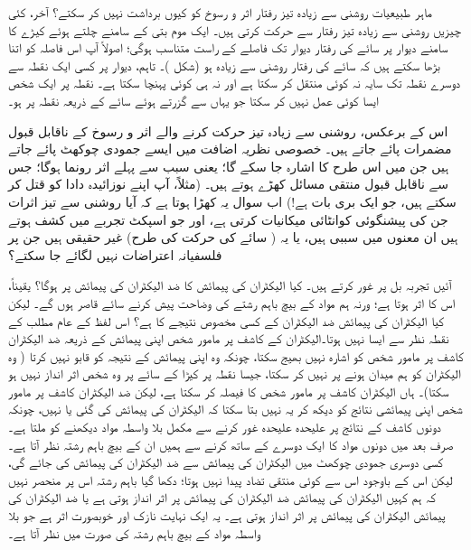 ماہر طبیعیات روشنی سے زیادہ تیز رفتار اثر و رسوخ کو کیوں برداشت نہیں کر سکتے؟ آخر،  کئی چیزیں روشنی سے زیادہ تیز رفتار سے حرکت کرتی ہیں۔ ایک موم بتی کے سامنے چلتے ہوئے کیڑے کا سامنے دیوار پر سائے  کی رفتار دیوار تک فاصلے کے راست متناسب ہوگی؛   اصولاً آپ اس فاصلہ کو اتنا بڑھا سکتے ہیں کہ سائے  کی رفتار روشنی سے زیادہ ہو (شکل )۔ تاہم،  دیوار پر کسی ایک نقطہ سے دوسرے نقطہ تک سایہ نہ کوئی   منتقل کر سکتا ہے اور نہ ہی کوئی   پہنچا سکتا ہے۔ نقطہ  پر ایک شخص ایسا کوئی عمل نہیں کر سکتا جو یہاں سے گزرتے ہوئے سائے کے ذریعہ نقطہ  پر    ہو۔


اس کے برعکس،  روشنی سے زیادہ تیز حرکت کرنے والے   اثر و رسوخ کے ناقابل قبول مضمرات  پائے جاتے ہیں۔ خصوصی نظریہ اضافت میں ایسے جمودی چوکھٹ پائے جاتے ہیں جن میں اس طرح کا اشارہ    جا سکے گا؛  یعنی سبب سے پہلے اثر رونما ہوگا؛  جس سے ناقابل قبول منتقی  مسائل کھڑے ہوتے ہیں۔  (مثلاً،   آپ اپنے نوزائیدہ   دادا کو قتل کر سکتے ہیں،  جو  ایک بری بات ہے!) اب سوال یہ کھڑا ہوتا ہے کہ آیا روشنی سے تیز اثرات جن کی پیشنگوئی  کوانٹائی میکانیات کرتی ہے،  اور جو  اسپکٹ  تجربے  میں  کشف ہوتے   ہیں ان معنوں میں سببی ہیں،  یا یہ ( سائے کی حرکت کی طرح)   غیر حقیقی  ہیں جن پر فلسفیانہ  اعتراضات نہیں لگائے جا سکتے؟

آئیں تجربہ بل پر غور کرتے ہیں۔ کیا الیکٹران کی پیمائش کا ضد الیکٹران کی پیمائش پر    ہوگا؟   یقیناً،  اس کا اثر ہوتا ہے؛  ورنہ ہم مواد کے بیچ باہم رشتے  کی وضاحت پیش کرنے سائے قاصر ہوں گے۔ لیکن کیا الیکٹران کی پیمائش ضد الیکٹران کے  کسی مخصوص نتیجے  کا   ہے؟  اس لفظ کے عام مطلب کے نقطہ نظر سے ایسا نہیں ہوتا۔الیکٹران کے کاشف پر  مامور   شخص اپنی پیمائش کے ذریعہ ضد الیکٹران کاشف پر مامور  شخص کو اشارہ نہیں بھیج سکتا،  چونکہ وہ  اپنی پیمائش کے نتیجہ کو  قابو نہیں کرتا ( وہ الیکٹران کو ہم میدان ہونے پر  نہیں  کر سکتا، جیسا نقطہ  پر کیڑا کے سائے پر وہ شخص اثر انداز نہیں ہو سکتا)۔  ہاں الیکٹران کاشف پر  مامور  شخص     کا فیصلہ کر سکتا ہے، لیکن  ضد الیکٹران کاشف پر  مامور  شخص اپنی پیمائشی نتائج کو دیکھ کر یہ نہیں بتا سکتا کہ الیکٹران کی  پیمائش کی گئی یا نہیں، چونکہ  دونوں کاشف کے نتائج پر علیحدہ علیحدہ غور کرنے سے مکمل بلا واسطہ مواد دیکھنے کو ملتا ہے۔ صرف بعد میں  دونوں مواد کا ایک دوسرے کے ساتھ    کرنے سے ہمیں ان کے بیچ باہم رشتہ نظر آتا ہے۔ کسی دوسری  جمودی چوکھٹ میں الیکٹران کی پیمائش سے    ضد الیکٹران کی پیمائش کی جائے گی،  لیکن اس کے باوجود اس سے  کوئی منتقی تضاد پیدا نہیں ہوتا؛  دکھا گیا باہم رشتہ اس پر منحصر نہیں کہ ہم کہیں الیکٹران کی پیمائش ضد الیکٹران کی پیمائش پر اثر انداز ہوتی ہے یا ضد الیکٹران کی پیمائش الیکٹران کی پیمائش پر اثر انداز ہوتی ہے۔ یہ ایک نہایت نازک اور خوبصورت اثر ہے جو بلا واسطہ مواد کے بیچ باہم رشتہ کی صورت میں نظر آتا ہے۔

